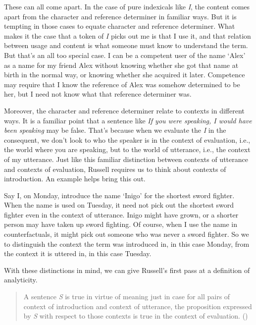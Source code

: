 \documentclass[
  10pt,
  letterpaper,
  DIV=11,
  numbers=noendperiod,
  twoside]{scrartcl}
\begin{document}
These can all come apart. In the case of pure indexicals like \emph{I},
the content comes apart from the character and reference determiner in
familiar ways. But it is tempting in those cases to equate character and
reference determiner. What makes it the case that a token of \emph{I}
picks out me is that I use it, and that relation between usage and
content is what someone must know to understand the term. But that's an
all too special case. I can be a competent user of the name `Alex' as a
name for my friend Alex without knowing whether she got that name at
birth in the normal way, or knowing whether she acquired it later.
Competence may require that I know the reference of Alex was somehow
determined to be her, but I need not know what that reference determiner
was.

Moreover, the character and reference determiner relate to contexts in
different ways. It is a familiar point that a sentence like \emph{If you
were speaking, I would have been speaking} may be false. That's because
when we evaluate the \emph{I} in the consequent, we don't look to who
the speaker is in the context of evaluation, i.e., the world where you
are speaking, but to the world of utterance, i.e., the context of my
utterance. Just like this familiar distinction between contexts of
utterance and contexts of evaluation, Russell requires us to think about
contexts of introduction. An example helps bring this out.

Say I, on Monday, introduce the name `Inigo' for the shortest sword
fighter. When the name is used on Tuesday, it need not pick out the
shortest sword fighter even in the context of utterance. Inigo might
have grown, or a shorter person may have taken up sword fighting. Of
course, when I use the name in counterfactuals, it might pick out
someone who was never a sword fighter. So we to distinguish the context
the term was introduced in, in this case Monday, from the context it is
uttered in, in this case Tuesday.

With these distinctions in mind, we can give Russell's first pass at a
definition of analyticity.

\begin{quote}
A sentence \emph{S} is true in virtue of meaning just in case for all
pairs of context of introduction and context of utterance, the
proposition expressed by \emph{S} with respect to those contexts is true
in the context of evaluation. ()
\end{quote}
\end{document}
